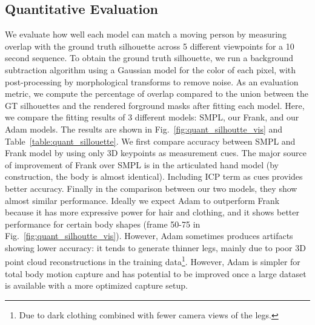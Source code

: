 \subsection{Quantitative Evaluation}
We evaluate how well each model can match a moving person by measuring overlap with the ground truth silhouette across 5 different viewpoints for a 10 second sequence. To obtain the ground truth silhouette, we run a background subtraction algorithm using a Gaussian model for the color of each pixel, with post-processing by morphological transforms to remove noise. As an evaluation metric, we compute the percentage of overlap compared to the union between the GT silhouettes and the rendered forground masks after fitting each model. Here, we compare the fitting results of 3 different models: SMPL, our Frank, and our Adam models. The results are shown in Fig.~\ref{fig:quant_silhoutte_vis} and Table~\ref{table:quant_sillouette}. We first compare accuracy between SMPL and Frank model by using only 3D keypoints as measurement cues. The major source of improvement of Frank over SMPL is in the articulated hand model (by construction, the body is almost identical). Including ICP term as cues provides better accuracy. Finally in the comparison between our two models, they show almost similar performance. Ideally we expect Adam to outperform Frank because it has more expressive power for hair and clothing, and it shows better performance for certain body shapes (frame 50-75 in Fig.~\ref{fig:quant_silhoutte_vis}). However, Adam sometimes produces artifacts showing lower accuracy: it tends to generate thinner legs, mainly due to poor 3D point cloud reconstructions in the training data\footnote{Due to dark clothing combined with fewer camera views of the legs.}. However, Adam is simpler for total body motion capture and has potential to be improved once a large dataset is available with a more optimized capture setup.


